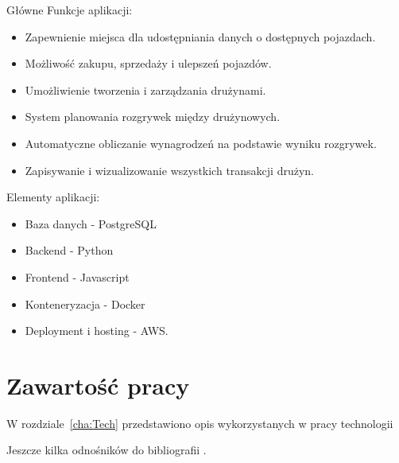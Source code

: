         Główne Funkcje aplikacji:
        \begin{itemize}
            \item Zapewnienie miejsca dla udostępniania danych o dostępnych pojazdach.
            \item Możliwość zakupu, sprzedaży i ulepszeń pojazdów.
            \item Umożliwienie tworzenia i zarządzania drużynami.
            \item System planowania rozgrywek między drużynowych.
            \item Automatyczne obliczanie wynagrodzeń na podstawie wyniku rozgrywek.
            \item Zapisywanie i wizualizowanie wszystkich transakcji drużyn.
        \end{itemize}%

        Elementy aplikacji:
        \begin{itemize}
            \item Baza danych - PostgreSQL
            \item Backend - Python
            \item Frontend - Javascript
            \item Konteneryzacja - Docker
            \item Deployment i hosting - AWS.
        \end{itemize}%


\section{Zawartość pracy}
\label{sec:zawartoscPracy}

W rozdziale~\ref{cha:Tech} przedstawiono opis wykorzystanych w pracy technologii

Jeszcze kilka odnośników do bibliografii \cite{PeDa04,BuDo03}.